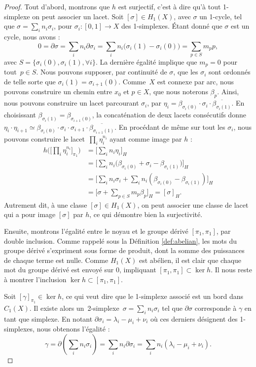 \begin{proof}
Tout d'abord, montrons que $h$ est surjectif, c'est à dire qu'à tout 1-simplexe on peut associer un lacet.
Soit $[\sigma]\in H_1(X)$, avec $\sigma$ un 1-cycle, tel que $\sigma=\sum_in_i\sigma_i$, pour $\sigma_i:[0,1]\to X$ des 1-simplexes. Étant donné que $\sigma$ est un cycle, nous avons : \[0=\partial\sigma=\sum_in_i\partial\sigma_i=\sum_in_i\big(\sigma_i(1)-\sigma_i(0)\big)=\sum_{p\in S}m_pp,\]avec $S=\{\sigma_i(0),\sigma_i(1),\forall i\}$. La dernière égalité implique que $m_p=0$ pour tout~$p\in S$. Nous pouvons supposer, par continuité de $\sigma$, que les $\sigma_i$ sont ordonnés de telle sorte que $\sigma_i(1)=\sigma_{i+1}(0)$. Comme~$X$ est connexe par arc, nous pouvons construire un chemin entre $x_0$ et $p\in X$, que nous noterons $\beta_p$. Ainsi, nous pouvons construire un lacet parcourant $\sigma_i$, par $\eta_i=\beta_{\sigma_i(0)}\cdot\sigma_i\cdot\overline{\beta_{\sigma_i(1)}}$. En choisissant $\beta_{\sigma_i(1)}=\beta_{\sigma_{i+1}(0)}$, la concaténation de deux lacets consécutifs donne~$\eta_i\cdot\eta_{i+1}\simeq \beta_{\sigma_i(0)}\cdot\sigma_i\cdot\sigma_{i+1}\cdot\overline{\beta_{\sigma_{i+1}(1)}}$. En procédant de même sur tout les $\sigma_i$, nous pouvons construire le lacet~$\prod_i\eta_i^{n_i}$ ayant comme image par $h$ : \[\begin{split}
h\Bigg(\Big[\prod_i\eta_i^{n_i}\Big]_{\pi_1}\Bigg)&=\Big[\sum_in_i\eta_i\Big]_H\\
&=\Big[\sum_in_i\big(\beta_{\sigma_i(0)}+\sigma_i-\beta_{\sigma_i(1)}\big)\Big]_H\\
&=\Big[\sum_in_i\sigma_i+\sum_in_i(\beta_{\sigma_i(0)}-\beta_{\sigma_i(1)})\Big]_H\\
&=\Big[\sigma+\sum_{p\in S}m_p\beta_p\Big]_H=[\sigma]_H.
\end{split}\]Autrement dit, à une classe $[\sigma]\in H_1(X)$, on peut associer une classe de lacet qui a pour image $[\sigma]$ par $h$, ce qui démontre bien la surjectivité.

\bigskip Ensuite, montrons l'égalité entre le noyau et le groupe dérivé $[\pi_1,\pi_1]$, par double inclusion. Comme rappelé sous la Définition \ref{def:abelian}, les mots du groupe dérivé s'expriment sous forme de produit, dont la somme des puissances de chaque terme est nulle. Comme $H_1(X)$ est abélien, il est clair que chaque mot du groupe dérivé est envoyé sur 0, impliquant $[\pi_1,\pi_1]\subset \ker h$. Il nous reste à montrer l'inclusion $\ker h\subset [\pi_1,\pi_1]$.

 Soit $[\gamma]_{\pi_1}\in\ker h$, ce qui veut dire que le 1-simplexe associé est un bord dans $C_1(X)$. Il existe alors un~2-simplexe~$\sigma=\sum_in_i\sigma_i$ tel que $\partial\sigma$ corresponde à $\gamma$ en tant que simplexe. En notant $\partial\sigma_i=\lambda_i-\mu_i+\nu_i$ où ces derniers désignent des 1-simplexes, nous obtenons l'égalité : \[\gamma=\partial\left(\sum_in_i\sigma_i\right)=\sum_in_i\partial\sigma_i=\sum_in_i(\lambda_i-\mu_i+\nu_i).\]


\end{proof}
